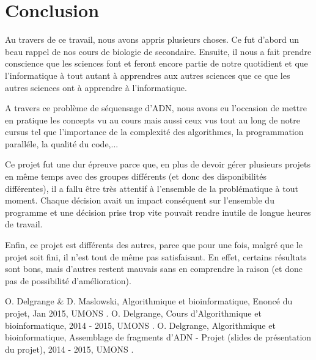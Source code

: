 \documentclass[12pt,a4paper,final]{article}
\begin{document}
\newpage
\section{Conclusion} 
Au travers de ce travail, nous avons appris plusieurs choses. Ce fut d'abord un beau rappel de nos cours de biologie de secondaire. Ensuite, il nous a fait prendre conscience que les sciences font et feront encore partie de notre quotidient et que l'informatique à tout autant à apprendres aux autres sciences que ce que les autres sciences ont à apprendre à l'informatique.

A travers ce problème de séquensage d'ADN, nous avons eu l'occasion de mettre en pratique les concepts vu au cours mais aussi ceux vus tout au long de notre cursus tel que l'importance de la complexité des algorithmes, la programmation paralléle, la qualité du code,...

Ce projet fut une dur épreuve parce que, en plus de devoir gérer plusieurs projets en même temps avec des groupes différents (et donc des disponibilités différentes), il a fallu être très attentif à l'ensemble de la problématique à tout moment. Chaque décision avait un impact conséquent sur l'ensemble du programme et une décision prise trop vite pouvait rendre inutile de longue heures de travail.

Enfin, ce projet est différents des autres, parce que pour une fois, malgré que le projet soit fini, il n'est tout de même pas satisfaisant. En effet, certains résultats sont bons, mais d'autres restent mauvais sans en comprendre la raison (et donc pas de possibilité d'amélioration).

\newpage
%
%
\begin{thebibliography}{9}
    O. Delgrange \& D. Maslowski,
    Algorithmique et bioinformatique, Enoncé du projet,
    Jan 2015,
    UMONS
		.
    O. Delgrange,
    Cours d'Algorithmique et bioinformatique,
    2014 - 2015,
    UMONS
		.
    O. Delgrange,
    Algorithmique et bioinformatique, Assemblage de fragments d’ADN - Projet (slides de présentation du projet),
    2014 - 2015,
    UMONS
		.
\end{thebibliography}
\end{document}
